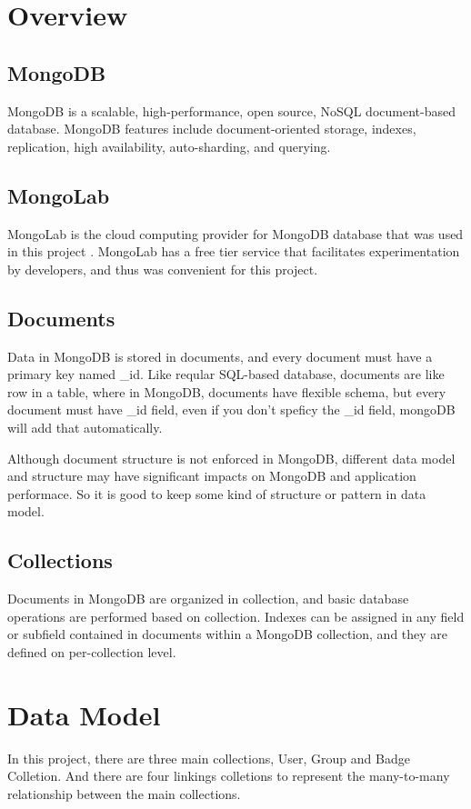 \lstset{breaklines=true}

\section{Overview}
\subsection{MongoDB}
 MongoDB is a scalable, high-performance, open source, NoSQL document-based database. MongoDB features include document-oriented storage, indexes, replication, high availability, auto-sharding, and querying.  \cite{mongodb}

\subsection{MongoLab}
MongoLab is the cloud computing provider for MongoDB database that was used in this project \cite{mongolab}.  MongoLab has a free tier service that facilitates experimentation by developers, and thus was convenient for this project. 

\subsection{Documents}
Data in MongoDB is stored in documents, and every document must have a primary key named {\_id}. Like reqular SQL-based database, documents are like row in a table, where in MongoDB, documents have flexible schema, but every document must have {\_id} field, even if you don't speficy the {\_id} field, mongoDB will add that automatically.  \cite{mongodb}

Although document structure is not enforced in MongoDB, different data model and structure may have significant impacts on MongoDB and application performace. So it is good to keep some kind of structure or pattern in data model.  

\subsection{Collections}
Documents in MongoDB are organized in collection, and basic database operations are performed based on collection. Indexes can be assigned in any field or subfield contained in documents within a MongoDB collection, and they are defined on per-collection level.  \cite{mongodb}   

\section{Data Model}
In this project, there are three main collections, User, Group and Badge Colletion. And there are four linkings colletions to represent the many-to-many relationship between the main collections.

